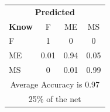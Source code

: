 \documentclass[12pt]{article} %
\begin{document}
\begin{minipage}{0.5\textwidth}
\begin{center}
\begin{tabular}{l|c|c|c|}
 \multicolumn{4}{c}{ \textbf{ Predicted}}\\
 \textbf{Know}&F&ME&MS\\ \hline\hline
F   &1&0&0\\
ME &0.01&0.94&0.05\\
MS &0&0.01&0.99\\
\multicolumn{4}{c}{Average Accuracy is 0.97}\\
\multicolumn{4}{c}{25\%  of the net}\\
\end{tabular}
\end{center}
\end{minipage}
\end{document}
